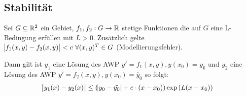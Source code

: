 \subsection{Stabilität}
Sei $G \subseteq \mathbb{R}^2$ ein Gebiet, $f_1, f_2: G \to \mathbb{R}$ stetige Funktionen die auf $G$ eine L-Bedingung erfüllen
mit $L > 0$. Zusätzlich gelte $\abs{f_1(x,y)-f_2(x,y)} < c\ \forall (x,y)^T \in G$ (Modellierungsfehler).

Dann gilt ist $y_1$ eine Lösung des AWP $y' = f_1(x,y), y(x_0) = y_0$ und $y_2$ eine Lösung des AWP 
$y' = f_2(x,y), y(x_0) = \tilde{y_0}$ so folgt:
\begin{equation*}
	\abs{y_1(x) - y_2(x)} \leq (\abs{y_0 - \tilde{y_0}} + c  \cdot (x-x_0)) \exp{(L (x-x_0))}
\end{equation*} 